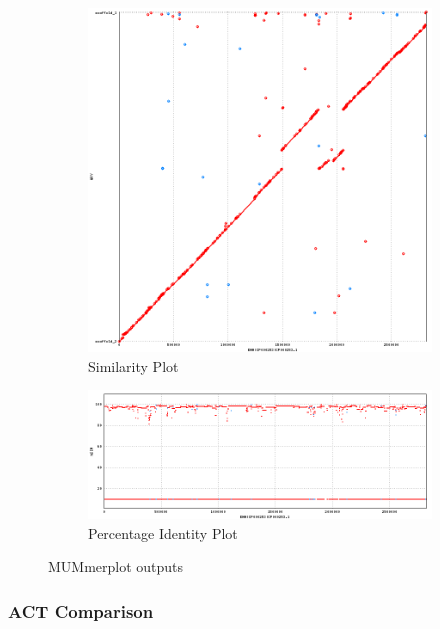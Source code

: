 \documentclass[a4paper,10pt]{article}
\begin{document}
\begin{figure}[htbp]
  \begin{subfigure}[b]{0.45\textwidth}
    \includegraphics[width=\textwidth]{MUMmerplot}
    \caption{Similarity Plot}
    \label{fig:mummerplot}
  \end{subfigure}
  \hfill
  \begin{subfigure}[b]{0.45\textwidth}
    \includegraphics[width=\textwidth]{MUMmerplot_pip}
    \caption{Percentage Identity Plot}
    \label{fig:mummerplotpip}
  \end{subfigure}
  \caption{MUMmerplot outputs}
\end{figure}

\subsubsection{ACT Comparison}
\end{document}

